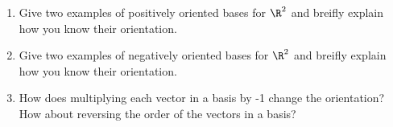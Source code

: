 \begin{exercises}
\begin{problist}
		\prob
		\begin{enumerate}
			\item Give two examples of positively oriented bases for $\R^2$
			and breifly explain how you know their orientation.
			\item Give two examples of negatively oriented bases for $\R^2$
			and breifly explain how you know their orientation.
			\item How does multiplying each vector in a basis by -1 change the orientation?
			How about reversing the order of the vectors in a basis?
		\end{enumerate}

	\end{problist}
\end{exercises}
